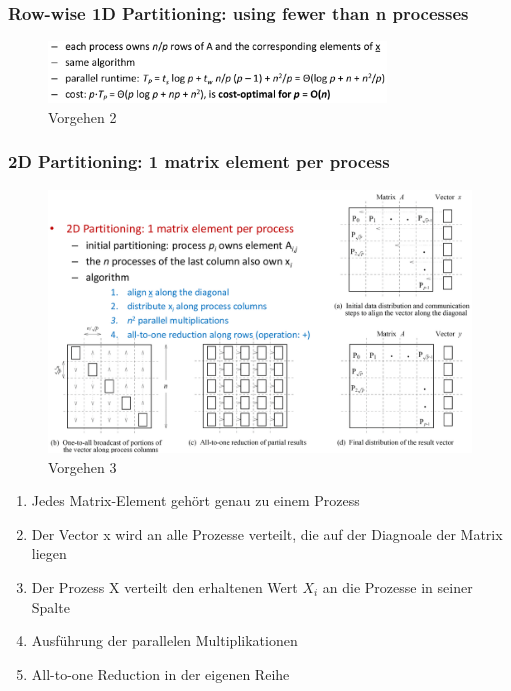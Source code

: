 \hypertarget{row-wise-1d-partitioning-using-fewer-than-n-processes}{%
\subsubsection{Row-wise 1D Partitioning: using fewer than n
processes}\label{row-wise-1d-partitioning-using-fewer-than-n-processes}}

\begin{figure}[H]
\centering
\includegraphics[width=0.8\textwidth]{figures/matrixVectorMulitplication2.png}
\caption{Vorgehen 2}
\end{figure}

\hypertarget{d-partitioning-1-matrix-element-per-process}{%
\subsubsection{2D Partitioning: 1 matrix element per
process}\label{d-partitioning-1-matrix-element-per-process}}

\begin{figure}[H]
\centering
\includegraphics[width=1\textwidth]{figures/matrixVectorMulitplication3.png}
\caption{Vorgehen 3}
\end{figure}

\begin{enumerate}
\def\labelenumi{\arabic{enumi}.}
\tightlist
\item
  Jedes Matrix-Element gehört genau zu einem Prozess
\item
  Der Vector x wird an alle Prozesse verteilt, die auf der Diagnoale der
  Matrix liegen
\item
  Der Prozess X verteilt den erhaltenen Wert $X_i$ an die Prozesse in
  seiner Spalte
\item
  Ausführung der parallelen Multiplikationen
\item
  All-to-one Reduction in der eigenen Reihe
\end{enumerate}

